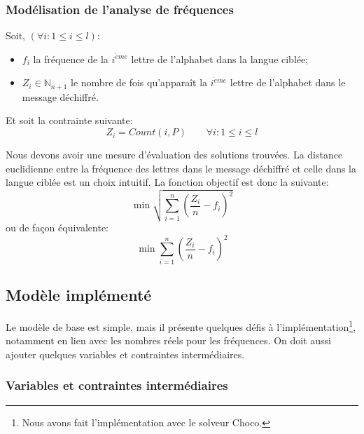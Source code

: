 \documentclass[11pt]{article}
\begin{document}
			\subsubsection{Modélisation de l'analyse de fréquences}

				Soit, $(\forall i : 1 \leq i \leq l)$:
				\begin{itemize}
					\item $f_i$ la fréquence de la $i^{\grave{e}me}$ lettre de l'alphabet dans la langue ciblée;
					\item $Z_i \in \mathbb{N}_{n+1}$ le nombre de fois qu'apparaît la $i^{\grave{e}me}$ lettre de l'alphabet dans le message déchiffré.
				\end{itemize}

				\bigskip

				Et soit la contrainte suivante:
				\begin{equation} \label{eq:2}
					Z_i = Count(i, P) \qquad \forall i : 1 \leq i \leq l
				\end{equation}

				Nous devons avoir une mesure d'évaluation des solutions trouvées. La distance euclidienne entre la fréquence des lettres dans le message déchiffré et celle dans la langue ciblée est un choix intuitif. La fonction objectif est donc la suivante:
				\begin{equation} \label{eq:3}
					\min \sqrt{\sum\limits_{i=1}^n (\frac{Z_i}{n} - f_i)^2}
				\end{equation}
				ou de façon équivalente:
				\begin{equation} \label{eq:4}
					\min \sum\limits_{i=1}^n (\frac{Z_i}{n} - f_i)^2
				\end{equation}

        \subsection{Modèle implémenté}

			Le modèle de base est simple, mais il présente quelques défis à l'implémentation\footnote{Nous avons fait l'implémentation avec le solveur Choco.}, notamment en lien avec les nombres réels pour les fréquences.
			On doit aussi ajouter quelques variables et contraintes intermédiaires.

			\subsubsection{Variables et contraintes intermédiaires}
\end{document}
